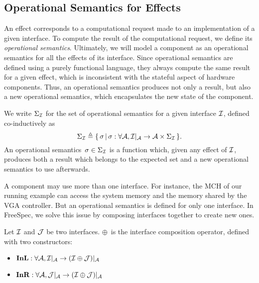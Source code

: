\subsection{Operational Semantics for Effects}

An effect corresponds to a computational request made to an implementation of a
given interface.
%
To compute the result of the computational request, we define its
\emph{operational semantics}.
%
Ultimately, we will model a component as an operational semantics for all the
effects of its interface.
%
Since operational semantics are defined using a purely functional language, they
always compute the same result for a given effect, which is inconsistent with
the stateful aspect of hardware components.
%
Thus, an operational semantics produces not only a result, but also a new
operational semantics, which encapsulates the new state of the component.

\begin{definition}
  We write $\Sigma_{\mathcal{I}}$ for the set of operational semantics for a
  given interface $\mathcal{I}$, defined co-inductively as
  \[
    \Sigma_{\mathcal{I}} \triangleq \{\,\sigma\,|\,\sigma : \forall \mathcal{A},
    \mathcal{I}|_{\mathcal{A}} \rightarrow \mathcal{A} \times \Sigma_{\mathcal{I}} \,\}.
  \]
  An operational semantics~$\sigma \in \Sigma_{\mathcal{I}}$ is a function which, given
  any effect of $\mathcal{I}$, produces both a result which belongs to the expected
  set and a new operational semantics to use afterwards.
\end{definition}

A component may use more than one interface.
%
For instance, the MCH of our running example can access the system memory and
the memory shared by the VGA controller.
%
But an operational semantics is defined for only one interface.
%
In FreeSpec, we solve this issue by composing interfaces together to create new
ones.

\begin{definition}
  Let $\mathcal{I}$ and $\mathcal{J}$ be two interfaces. $\oplus$~is the interface
  composition operator, defined with two constructors:
  \begin{itemize}
  \item $\mathbf{\mathbf{InL}} : \forall \mathcal{A}, \mathcal{I}|_{\mathcal{A}}
  \rightarrow (\mathcal{I} \oplus \mathcal{J})|_{\mathcal{A}}$
  \item $\mathbf{\mathbf{InR}} : \forall \mathcal{A}, \mathcal{J}|_{\mathcal{A}}
  \rightarrow (\mathcal{I} \oplus \mathcal{J})|_{\mathcal{A}}$
  \end{itemize}
\end{definition}

